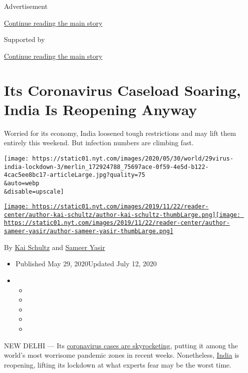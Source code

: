 Advertisement

\protect\hyperlink{after-top}{Continue reading the main story}

Supported by

\protect\hyperlink{after-sponsor}{Continue reading the main story}

\hypertarget{its-coronavirus-caseload-soaring-india-is-reopening-anyway}{%
\section{Its Coronavirus Caseload Soaring, India Is Reopening
Anyway}\label{its-coronavirus-caseload-soaring-india-is-reopening-anyway}}

Worried for its economy, India loosened tough restrictions and may lift
them entirely this weekend. But infection numbers are climbing fast.

\texttt{[image: https://static01.nyt.com/images/2020/05/30/world/29virus-india-lockdown-3/merlin\_172924788\_75697ace-0f59-4e5d-b122-4cac5ee8bc17-articleLarge.jpg?quality=75\\\&auto=webp\\\&disable=upscale]}

\href{https://www.nytimes.com/by/kai-schultz}{\texttt{[image: https://static01.nyt.com/images/2019/11/22/reader-center/author-kai-schultz/author-kai-schultz-thumbLarge.png]}}\href{https://www.nytimes.com/by/sameer-yasir}{\texttt{[image: https://static01.nyt.com/images/2019/11/22/reader-center/author-sameer-yasir/author-sameer-yasir-thumbLarge.png]}}

By \href{https://www.nytimes.com/by/kai-schultz}{Kai Schultz} and
\href{https://www.nytimes.com/by/sameer-yasir}{Sameer Yasir}

\begin{itemize}
\item
  Published May 29, 2020Updated July 12, 2020
\item
  \begin{itemize}
  \item
  \item
  \item
  \item
  \item
  \end{itemize}
\end{itemize}

NEW DELHI --- Its
\href{https://www.nytimes.com/2020/05/06/world/asia/india-coronavirus-lockdown-infections.html}{coronavirus
cases are skyrocketing}, putting it among the world's most worrisome
pandemic zones in recent weeks. Nonetheless,
\href{https://www.nytimes.com/2020/07/02/world/asia/india-coronavirus-wedding-groom.html}{India}
is reopening, lifting its lockdown at what experts fear may be the worst
time.

